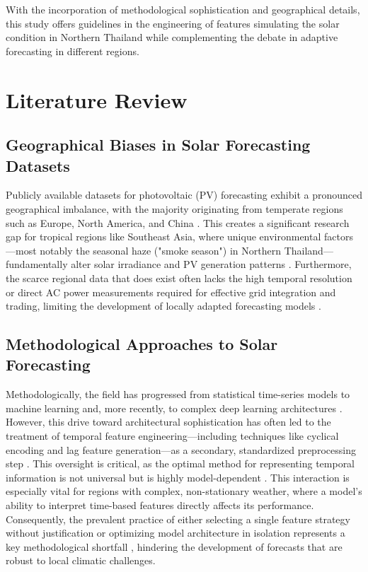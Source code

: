 \documentclass[conference]{IEEEtran}
\begin{document}
	With the incorporation of methodological sophistication and geographical details, this study offers guidelines in the engineering of features simulating the solar condition in Northern Thailand while complementing the debate in adaptive forecasting in different regions.
	
	\section{Literature Review}
	
	
	
	\subsection{Geographical Biases in Solar Forecasting Datasets}
	Publicly available datasets for photovoltaic (PV) forecasting exhibit a pronounced geographical imbalance, with the majority originating from temperate regions such as Europe, North America, and China \cite{EuropeanDataset2019, NREL2018, ChinaSolar2020}. This creates a significant research gap for tropical regions like Southeast Asia, where unique environmental factors—most notably the seasonal haze ("smoke season") in Northern Thailand—fundamentally alter solar irradiance and PV generation patterns \cite{Amnuaylojaroen2020, ASEANEnergy2022}. Furthermore, the scarce regional data that does exist often lacks the high temporal resolution or direct AC power measurements required for effective grid integration and trading, limiting the development of locally adapted forecasting models \cite{Seng2021, Ahmed2020}.
	
	\subsection{Methodological Approaches to Solar Forecasting}
	Methodologically, the field has progressed from statistical time-series models to machine learning and, more recently, to complex deep learning architectures \cite{LeCun2015, Hochreiter1997}. However, this drive toward architectural sophistication has often led to the treatment of temporal feature engineering—including techniques like cyclical encoding and lag feature generation—as a secondary, standardized preprocessing step \cite{Cerqueira2020, BoxJenkins1976}. This oversight is critical, as the optimal method for representing temporal information is not universal but is highly model-dependent \cite{Bommes2021}. This interaction is especially vital for regions with complex, non-stationary weather, where a model's ability to interpret time-based features directly affects its performance. Consequently, the prevalent practice of either selecting a single feature strategy without justification or optimizing model architecture in isolation represents a key methodological shortfall \cite{Wang2019}, hindering the development of forecasts that are robust to local climatic challenges.
	
\end{document}
